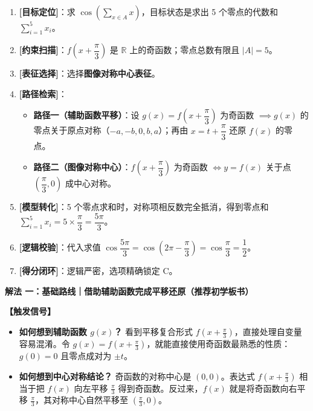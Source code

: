 \documentclass[11pt,a4paper,fontset=fandol]{ctexart}
\newcommand{\method}[1]{\par\medskip\noindent\textbf{解法 #1}\par}
\begin{document}
\medskip
\begin{tcolorbox}[colback=gray!4,colframe=ink!70,boxrule=0.7pt,arc=1mm,before skip=6pt,after skip=6pt,top=4pt,bottom=4pt,title=\textbf{决策路线}]
\begin{enumerate}[label=\textbf{\arabic*\ },leftmargin=1.8em]
  \item \textbf{[目标定位]}：求 \(\cos\left(\sum_{x \in A} x\right)\)，目标状态是求出 5 个零点的代数和 \(\sum_{i=1}^5 x_i\)。
  \item \textbf{[约束扫描]}：\(f\left(x+\dfrac{\pi}{3}\right)\) 是 \(\mathbb{R}\) 上的奇函数；零点总数有限且 \(|A|=5\)。
  \item \textbf{[表征选择]}：选择\textbf{图像对称中心表征}。
  \item \textbf{[路径检索]}：
    \begin{itemize}
      \item \textbf{路径一（辅助函数平移）}：设 \(g(x) = f\left(x+\dfrac{\pi}{3}\right)\) 为奇函数 \(\implies g(x)\) 的零点关于原点对称（\(-a, -b, 0, b, a\)）；再由 \(x = t + \dfrac{\pi}{3}\) 还原 \(f(x)\) 的零点。
      \item \textbf{路径二（图像对称中心）}：\(f\left(x+\dfrac{\pi}{3}\right)\) 为奇函数 \(\iff y=f(x)\) 关于点 \(\left(\dfrac{\pi}{3}, 0\right)\) 成中心对称。
    \end{itemize}
  \item \textbf{[模型转化]}：5 个零点求和时，对称项相反数完全抵消，得到零点和 \(\sum_{i=1}^5 x_i = 5 \times \dfrac{\pi}{3} = \dfrac{5\pi}{3}\)。
  \item \textbf{[逻辑校验]}：代入求值 \(\cos\dfrac{5\pi}{3} = \cos\left(2\pi - \dfrac{\pi}{3}\right) = \cos\dfrac{\pi}{3} = \dfrac{1}{2}\)。
  \item \textbf{[得分闭环]}：逻辑严密，选项精确锁定 C。
\end{enumerate}
\end{tcolorbox}

\method{一：基础路线｜借助辅助函数完成平移还原（推荐初学板书）}

\noindent\textbf{【触发信号】}
\begin{itemize}[leftmargin=1.5em]
  \item \textbf{如何想到辅助函数 $g(x)$？} 看到平移复合形式 \(f(x+\frac{\pi}{3})\)，直接处理自变量容易混淆。令 \(g(x) = f(x+\frac{\pi}{3})\)，就能直接使用奇函数最熟悉的性质：\(g(0)=0\) 且零点成对为 \(\pm t\)。
  \item \textbf{如何想到中心对称结论？} 奇函数的对称中心是 \((0,0)\)。表达式 \(f(x+\frac{\pi}{3})\) 相当于把 \(f(x)\) 向左平移 \(\frac{\pi}{3}\) 得到奇函数。反过来，\(f(x)\) 就是将奇函数向右平移 \(\frac{\pi}{3}\)，其对称中心自然平移至 \(\left(\frac{\pi}{3}, 0\right)\)。
\end{itemize}
\end{document}
